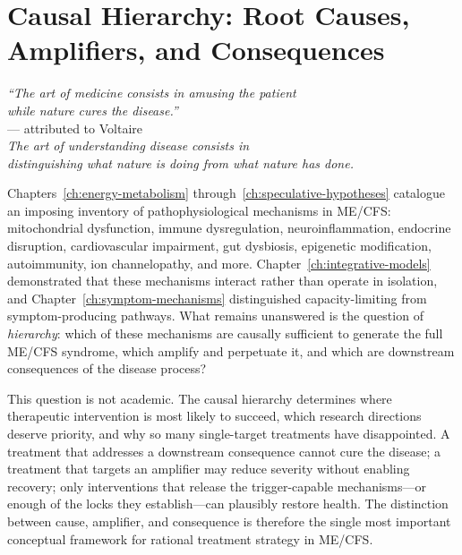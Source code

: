 \chapter{Causal Hierarchy: Root Causes, Amplifiers, and Consequences}
\label{ch:causal-hierarchy}

\begin{flushright}
\textit{``The art of medicine consists in amusing the patient\\
while nature cures the disease.''}\\
--- attributed to Voltaire\\[0.5em]
\textit{The art of understanding disease consists in\\
distinguishing what nature is doing from what nature has done.}
\end{flushright}

\vspace{1em}

Chapters~\ref{ch:energy-metabolism} through~\ref{ch:speculative-hypotheses} catalogue an imposing inventory of pathophysiological mechanisms in ME/CFS: mitochondrial dysfunction, immune dysregulation, neuroinflammation, endocrine disruption, cardiovascular impairment, gut dysbiosis, epigenetic modification, autoimmunity, ion channelopathy, and more. Chapter~\ref{ch:integrative-models} demonstrated that these mechanisms interact rather than operate in isolation, and Chapter~\ref{ch:symptom-mechanisms} distinguished capacity-limiting from symptom-producing pathways. What remains unanswered is the question of \emph{hierarchy}: which of these mechanisms are causally sufficient to generate the full ME/CFS syndrome, which amplify and perpetuate it, and which are downstream consequences of the disease process?

This question is not academic. The causal hierarchy determines where therapeutic intervention is most likely to succeed, which research directions deserve priority, and why so many single-target treatments have disappointed. A treatment that addresses a downstream consequence cannot cure the disease; a treatment that targets an amplifier may reduce severity without enabling recovery; only interventions that release the trigger-capable mechanisms---or enough of the locks they establish---can plausibly restore health. The distinction between cause, amplifier, and consequence is therefore the single most important conceptual framework for rational treatment strategy in ME/CFS.

